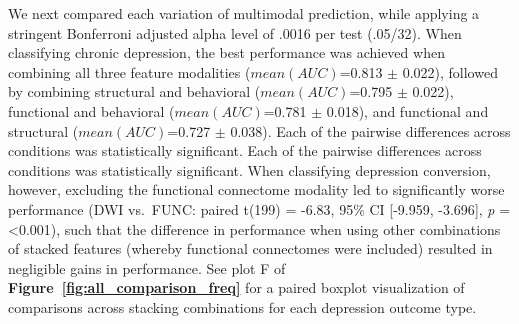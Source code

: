 \documentclass[
  notitlepage]{article}
\begin{document}
We next compared each variation of multimodal prediction, while applying
a stringent Bonferroni adjusted alpha level of .0016 per test (.05/32).
When classifying chronic depression, the best performance was achieved
when combining all three feature modalities (\(mean(AUC)\)=0.813 \(\pm\)
0.022), followed by combining structural and behavioral
(\(mean(AUC)\)=0.795 \(\pm\) 0.022), functional and behavioral
(\(mean(AUC)\)=0.781 \(\pm\) 0.018), and functional and structural
(\(mean(AUC)\)=0.727 \(\pm\) 0.038). Each of the pairwise differences
across conditions was statistically significant. Each of the pairwise
differences across conditions was statistically significant. When
classifying depression conversion, however, excluding the functional
connectome modality led to significantly worse performance (DWI
vs.~FUNC: paired t(199) = -6.83, 95\% CI {[}-9.959, -3.696{]}, \emph{p}
= \textless0.001), such that the difference in performance when using
other combinations of stacked features (whereby functional connectomes
were included) resulted in negligible gains in performance. See plot F
of \textbf{Figure~\ref{fig:all_comparison_freq}} for a paired boxplot
visualization of comparisons across stacking combinations for each
depression outcome type.
\end{document}
